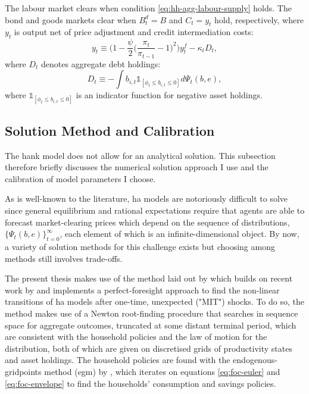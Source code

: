 \documentclass[a4paper,12pt]{article} %
\numberwithin{equation}{section} %
\numberwithin{figure}{section}
\numberwithin{table}{section}
\begin{document}
The labour market clears when condition \eqref{eq:hh-agg-labour-supply} holds. The bond and goods markets clear when $B_t^d = B$ and $C_t = y_t$ hold, respectively, where $y_t$ is output net of price adjustment and credit intermediation costs:
\begin{equation}
    y_t \equiv \Bigg( 1 - \frac{\psi}{2} \Bigg( \frac{\pi_t}{\pi_{t-1}} - 1 \Bigg)^2 \Bigg) y_t^f - \kappa_t D_t, \label{eq:effective-gdp}
\end{equation}
where $D_t$ denotes aggregate debt holdings:
\begin{equation}
    D_t \equiv - \int b_{i,t} \mathbb{1}_{[\phi_t \le b_{i,t} \le 0]} d \Psi_t (b,e), \label{eq:agg-debt}
\end{equation}
where $\mathbb{1}_{[\phi_t \le b_{i,t} \le 0]}$ is an indicator function for negative asset holdings.

\subsection{Solution Method and Calibration}
\label{sec:model-solution}

The \Gls{hank} model does not allow for an analytical solution. This subsection therefore briefly discusses the numerical solution approach I use and the calibration of model parameters I choose.

As is well-known to the literature, \Gls{ha} models are notoriously difficult to solve since general equilibrium and rational expectations require that agents are able to forecast market-clearing prices which depend on the sequence of distributions, $\{ \Psi_t (b,e) \}_{t=0}^{\infty} $, each element of which is an infinite-dimensional object. By now, a variety of solution methods for this challenge exists but choosing among methods still involves trade-offs. 

The present thesis makes use of the method laid out by \textcite{boehl2023econpizza} which builds on recent work by \textcite{auclert2021} and implements a perfect-foresight approach to find the non-linear transitions of \Gls{ha} models after one-time, unexpected ("MIT") shocks. To do so, the method makes use of a Newton root-finding procedure that searches in sequence space for aggregate outcomes, truncated at some distant terminal period, which are consistent with the household policies and the law of motion for the distribution, both of which are given on discretised grids of productivity states and asset holdings. The household policies are found with the endogenous-gridpoints method (\Gls{egm}) by \textcite{carroll2006}, which iterates on equations \eqref{eq:foc-euler} and \eqref{eq:foc-envelope} to find the households' consumption and savings policies.
\end{document}
